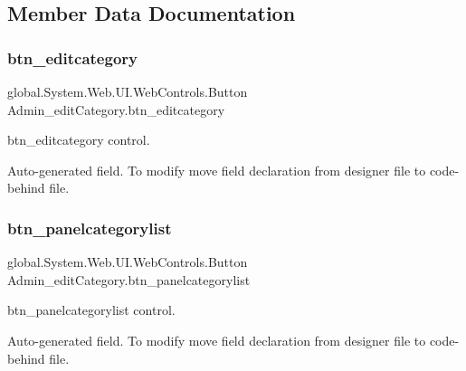 \subsection{Member Data Documentation}
\mbox{\label{class_admin__edit_category_a4f54c465076017e1d5ccdce8babbc9c8}} 
\subsubsection{\texorpdfstring{btn\_editcategory}{btn\_editcategory}}
{\footnotesize\ttfamily global.\+System.\+Web.\+U\+I.\+Web\+Controls.\+Button Admin\+\_\+edit\+Category.\+btn\+\_\+editcategory\hspace{0.3cm}{\ttfamily [protected]}}



btn\+\_\+editcategory control. 

Auto-\/generated field. To modify move field declaration from designer file to code-\/behind file. \mbox{\label{class_admin__edit_category_a2aa6d0590ac829f5c63575a7a28551db}} 
\subsubsection{\texorpdfstring{btn\_panelcategorylist}{btn\_panelcategorylist}}
{\footnotesize\ttfamily global.\+System.\+Web.\+U\+I.\+Web\+Controls.\+Button Admin\+\_\+edit\+Category.\+btn\+\_\+panelcategorylist\hspace{0.3cm}{\ttfamily [protected]}}



btn\+\_\+panelcategorylist control. 

Auto-\/generated field. To modify move field declaration from designer file to code-\/behind file. \mbox{\label{class_admin__edit_category_a36a78751c26371baf48b0621cc7caab7}} 
